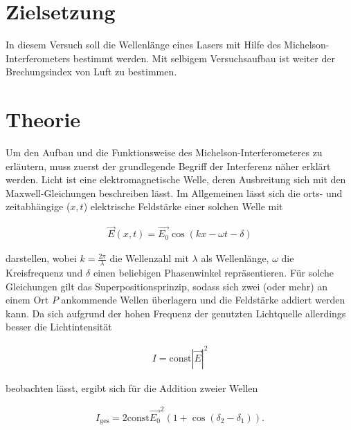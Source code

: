 \section{Zielsetzung}
\label{sec:Zielsetzung}
In diesem Versuch soll die Wellenlänge eines Lasers mit Hilfe des Michelson-Interferometers bestimmt werden.
Mit selbigem Versuchsaufbau ist weiter der Brechungsindex von Luft zu bestimmen.

\section{Theorie}
\label{sec:Theorie}

Um den Aufbau und die Funktionsweise des Michelson-Interferometeres zu erläutern, 
muss zuerst der grundlegende Begriff der Interferenz näher erklärt werden. Licht
ist eine elektromagnetische Welle, deren Ausbreitung sich mit den Maxwell-Gleichungen
beschreiben lässt. Im Allgemeinen lässt sich die orts- und zeitabhängige ($x,t$) elektrische Feldstärke einer solchen Welle mit

\begin{align}
\vec{E}(x,t) = \vec{E_\text{0}} \cos(kx - \omega t - \delta)
\end{align}

darstellen, wobei $k = \frac{2\pi}{\lambda}$ die Wellenzahl mit $\lambda$ als Wellenlänge, $\omega$ die Kreisfrequenz
und $\delta$ einen beliebigen Phasenwinkel repräsentieren. Für solche Gleichungen gilt das Superpositionsprinzip,
sodass sich zwei (oder mehr) an einem Ort $P$ ankommende Wellen überlagern und die Feldstärke addiert werden kann.
Da sich aufgrund der hohen Frequenz der genutzten Lichtquelle allerdings besser die Lichtintensität 

\begin{align*}
I = \mathrm{const} |\vec{E}|^{2}
\end{align*}

beobachten lässt, ergibt sich für die Addition zweier Wellen

\begin{align}
I_\text{ges} = 2 \mathrm{const} \vec{E_\text{0}}^{2} (1 + \cos(\delta_\text{2} - \delta_\text{1})).
\end{align}

